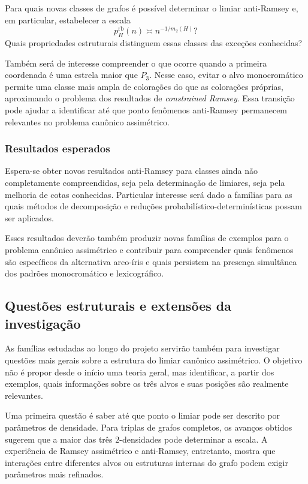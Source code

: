 \documentclass[11pt,a4paper]{article}
\theoremstyle{plain}
\theoremstyle{definition}
\newcounter{question}[section]
\renewcommand{\thequestion}{\thesection.\arabic{question}}
\newenvironment{question}[1][]{%
  \refstepcounter{question}%
  \begin{tcolorbox}[
    enhanced,
    colback=qbluebg,
    colframe=qblue,
    arc=4pt,
    boxrule=1.2pt,
    left=8pt, right=8pt, top=6pt, bottom=6pt,
    fonttitle=\bfseries\sffamily,
    title={\color{white}Pergunta~\thequestion\ifx&#1&\else\ (#1)\fi},
    coltitle=white,
    attach boxed title to top left={yshift=-2mm, xshift=6pt},
    boxed title style={colback=qblue, arc=3pt, boxrule=0pt},
  ]%
  \itshape
}{%
  \end{tcolorbox}%
}
\begin{document}
\begin{question}
  \label{q:2bal}
  Para quais novas classes de grafos é possível determinar o limiar
  anti-Ramsey e, em particular, estabelecer a escala
  \[
    p_H^{\mathrm{rb}}(n)
    \asymp
    n^{-1/m_2(H)}?
  \]
  Quais propriedades estruturais distinguem essas classes das
  exceções conhecidas?
\end{question}

Também será de interesse compreender o que ocorre quando a primeira
coordenada é uma estrela maior que $P_3$. Nesse caso, evitar o alvo
monocromático permite uma classe mais ampla de colorações do que as
colorações próprias, aproximando o problema dos resultados de
\emph{constrained Ramsey}. Essa transição pode ajudar a identificar
até que ponto fenômenos anti-Ramsey permanecem relevantes no problema
canônico assimétrico.

\subsubsection{Resultados esperados}

Espera-se obter novos resultados anti-Ramsey para classes ainda não
completamente compreendidas, seja pela determinação de limiares, seja
pela melhoria de cotas conhecidas. Particular interesse será dado a
famílias para as quais métodos de decomposição e reduções
probabilístico-determinísticas possam ser aplicados.

Esses resultados deverão também produzir novas famílias de exemplos
para o problema canônico assimétrico e contribuir para compreender
quais fenômenos são específicos da alternativa arco-íris e quais
persistem na presença simultânea dos padrões monocromático e
lexicográfico.


\subsection{Questões estruturais e extensões da investigação}
\label{sec:estruturais}


As famílias estudadas ao longo do projeto servirão também para
investigar questões mais gerais sobre a estrutura do limiar canônico
assimétrico. O objetivo não é propor desde o início uma teoria geral,
mas identificar, a partir dos exemplos, quais informações sobre os
três alvos e suas posições são realmente relevantes.

Uma primeira questão é saber até que ponto o limiar pode ser descrito
por parâmetros de densidade. Para triplas de grafos completos, os
avanços obtidos sugerem que a maior das três $2$-densidades pode
determinar a escala. A experiência de Ramsey assimétrico e anti-Ramsey,
entretanto, mostra que interações entre diferentes alvos ou estruturas
internas do grafo podem exigir parâmetros mais refinados.
\end{document}
